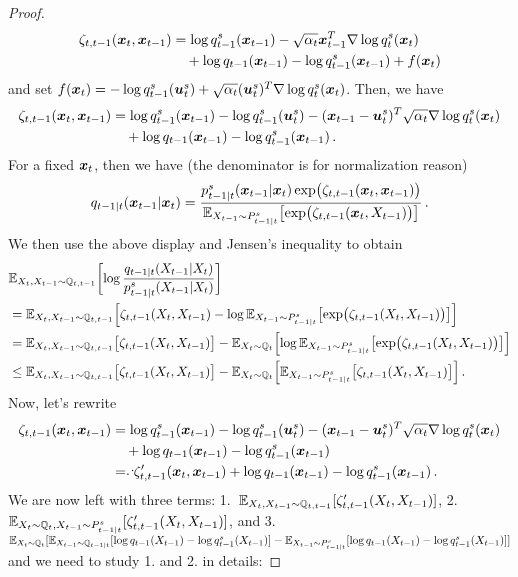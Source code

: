 \begin{proof}
\begin{align*}
\zeta_{t,t-1}(\x_t,\x_{t-1})&=\log \Fdds_{t-1}(\x_{t-1})-\sqrt{\alpha_t}\x_{t-1}^T\nabla \log \Fdds_t(\x_t)\\
&~~~+ \log \Fdd_{t-1}(\x_{t-1})-\log \Fdds_{t-1}(\x_{t-1})+f(\x_t)
\end{align*}
and set $f(\x_t)=-\log \Fdds_{t-1}(\us_t)+\sqrt{\alpha_t}(\us_{t})^{T}\nabla \log \Fdds_t(\x_{t})$. 
Then, we have 
\begin{align*}
  \zeta_{t,t-1}(\x_t,\x_{t-1})&= \log \Fdds_{t-1}(\x_{t-1})-\log \Fdds_{t-1}(\us_t)-(\x_{t-1}-\us_{t})^T\sqrt{\alpha_t}\nabla \log \Fdds_t(\x_{t})\\
  &~~~+ \log \Fdd_{t-1}(\x_{t-1})-\log \Fdds_{t-1}(\x_{t-1})\,.
\end{align*}
For a fixed $\x_t$, then we  have (the denominator is for normalization reason)
\begin{equation*}
    \Fdd_{t-1|t}(\x_{t-1}|\x_t) =\frac{\Bdds_{t-1|t}(\x_{t-1}|\x_t)\exp\bigl( \zeta_{t,t-1}(\x_t,\x_{t-1})\bigr)}{\E_{X_{t-1}\sim \Bds_{t-1|t}}\bigl[\exp\bigl( \zeta_{t,t-1}(\x_t,X_{t-1})\bigr)\bigr]}\,.
\end{equation*}
We then use the above display and Jensen's inequality to obtain  
\begin{align*}
   &\E_{X_t,X_{t-1}\sim \Fd_{t,t-1}}\biggl[\log\frac{\Fdd_{t-1|t}(X_{t-1}|X_t)}{\Bdd^s_{t-1|t}(X_{t-1}|X_t)}\biggr]\\
   &=\E_{X_t,X_{t-1}\sim \Fd_{t,t-1}}\Bigl[\zeta_{t,t-1}(X_t,X_{t-1})
   -\log \E_{X_{t-1}\sim \Bds_{t-1|t}}\bigl[\exp\bigl( \zeta_{t,t-1}(X_t,X_{t-1})\bigr)\bigr] \Bigr]\\
    &=\E_{X_t,X_{t-1}\sim \Fd_{t,t-1}}\bigl[\zeta_{t,t-1}(X_t,X_{t-1})\bigr]
   -\E_{X_t\sim \Fd_{t}}\Bigl[\log \E_{X_{t-1}\sim \Bds_{t-1|t}}\bigl[\exp\bigl( \zeta_{t,t-1}(X_t,X_{t-1})\bigr)\bigr] \Bigr]\\
   &\le \E_{X_t,X_{t-1}\sim \Fd_{t,t-1}}\bigl[\zeta_{t,t-1}(X_t,X_{t-1})\bigr]
   -\E_{X_t\sim \Fd_{t}}\Bigl[ \E_{X_{t-1}\sim \Bds_{t-1|t}}\bigl[ \zeta_{t,t-1}(X_t,X_{t-1})\bigr] \Bigr]\,.
\end{align*}
Now, let's rewrite 
\begin{align*}
  \zeta_{t,t-1}(\x_t,\x_{t-1})&= \log \Fdds_{t-1}(\x_{t-1})-\log \Fdds_{t-1}(\us_t)-(\x_{t-1}-\us_{t})^T\sqrt{\alpha_t}\nabla \log \Fdds_t(\x_{t})\\
  &~~~+ \log \Fdd_{t-1}(\x_{t-1})-\log \Fdds_{t-1}(\x_{t-1})\\
  &\eqd\zeta'_{t,t-1}(\x_t,\x_{t-1})+ \log \Fdd_{t-1}(\x_{t-1})-\log \Fdds_{t-1}(\x_{t-1})\,.
\end{align*}
We are now left with  three terms: 
1.~$\E_{X_t,X_{t-1}\sim \Fd_{t,t-1}}[\zeta'_{t,t-1}(X_t,X_{t-1})]$, 2.~$\allowbreak \E_{X_t\sim \Fd_{t},X_{t-1}\sim \Bds_{t-1|t}}[\zeta'_{t,t-1}(X_t,X_{t-1})]$,
and 
3.~$\E_{X_{t}\sim \Fd_{t}}[\E_{X_{t-1}\sim \Fd_{t-1|t}}[\log \Fdd_{t-1}(X_{t-1})-\log \Fdds_{t-1}(X_{t-1})]-\E_{X_{t-1}\sim \Bds_{t-1|t}}[\log \Fdd_{t-1}(X_{t-1})-\log \Fdds_{t-1}(X_{t-1})]]$ and we need to study  1. and 2. in details: 



\end{proof}
